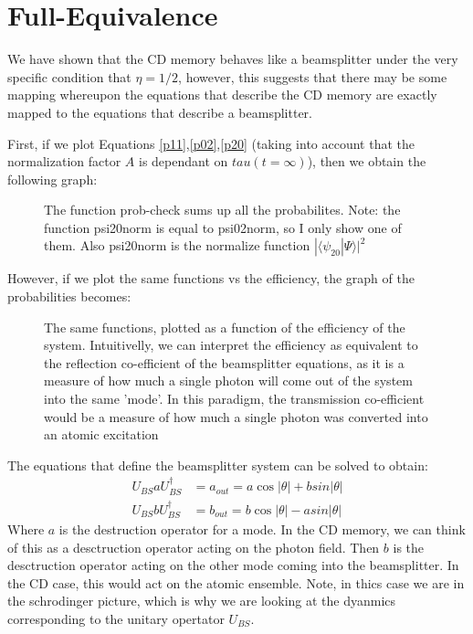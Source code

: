 \documentclass[12pt]{article}
\begin{document}
\section{Full-Equivalence}
We have shown that the CD memory behaves like a beamsplitter under the very specific condition that $\eta = 1/2$, however, this suggests that there may be some mapping whereupon the equations that describe the CD memory are exactly mapped to the equations that describe a beamsplitter. 

First, if we plot Equations \eqref{p11},\eqref{p02},\eqref{p20} (taking into account that the normalization factor $A$ is dependant on $tau(t=\infty)$), then we obtain the following graph:
\begin{figure}
\caption{The function prob-check sums up all the probabilites. Note: the function psi20norm is equal to psi02norm, so I only show one of them. Also psi20norm is the normalize function $|\langle \psi_20 | \Psi \rangle|^2$}

\end{figure}

However, if we plot the same functions vs the efficiency, the graph of the probabilities becomes:
\begin{figure}[H]
\caption{The same functions, plotted as a function of the efficiency of the system. Intuitivelly, we can interpret the efficiency as equivalent to the reflection co-efficient of the beamsplitter equations, as it is a measure of how much a single photon will come out of the system into the same 'mode'. In this paradigm, the transmission co-efficient would be a measure of how much a single photon was converted into an atomic excitation}

\end{figure}

The equations that define the beamsplitter system can be solved to obtain:
\begin{align}
U_{BS} a U^\dagger_{BS} &= a_{out}= a \cos  |\theta| + b sin| \theta|\\
U_{BS} b U^\dagger_{BS} &= b_{out}=b \cos  |\theta| - a sin| \theta|
\end{align}
Where $a$ is the destruction operator for a mode. In the CD memory, we can think of this as a desctruction operator acting on the photon field. Then $b$ is the desctruction operator acting on the other mode coming into the beamsplitter. In the CD case, this would act on the atomic ensemble. Note, in thics case we are in the schrodinger picture, which is why we are looking at the dyanmics corresponding to the unitary opertator $U_{BS}$.
\end{document}
